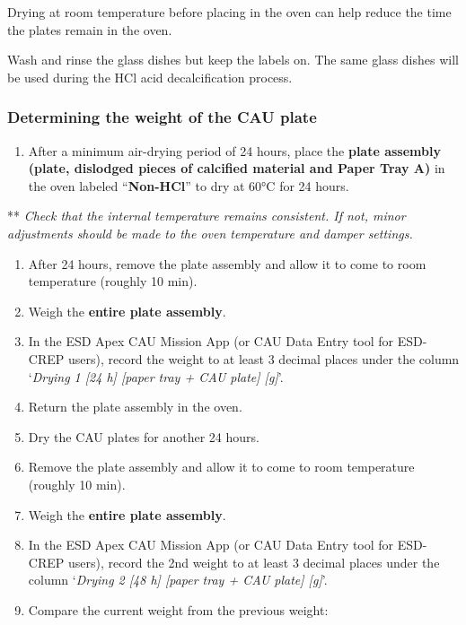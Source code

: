 \documentclass[]{book}
\providecommand{\tightlist}{%
  \setlength{\itemsep}{0pt}\setlength{\parskip}{0pt}}
\begin{document}
Drying at room temperature before placing in the oven can help reduce the time the plates remain in the oven.

Wash and rinse the glass dishes but keep the labels on. The same glass dishes will be used during the HCl acid decalcification process.

\hypertarget{determining-the-weight-of-the-cau-plate}{%
\subsubsection{Determining the weight of the CAU plate}\label{determining-the-weight-of-the-cau-plate}}

\begin{enumerate}
\def\labelenumi{\arabic{enumi}.}
\tightlist
\item
  After a minimum air-drying period of 24 hours, place the \textbf{plate assembly (plate, dislodged pieces of calcified material and Paper Tray A)} in the oven labeled ``\textbf{Non-HCl}'' to dry at 60°C for 24 hours.
\end{enumerate}

** \emph{Check that the internal temperature remains consistent. If not, minor adjustments should be made to the oven temperature and damper settings.}

\begin{enumerate}
\def\labelenumi{\arabic{enumi}.}
\setcounter{enumi}{1}
\item
  After 24 hours, remove the plate assembly and allow it to come to room temperature (roughly 10 min).
\item
  Weigh the \textbf{entire plate assembly}.
\item
  In the ESD Apex CAU Mission App (or CAU Data Entry tool for ESD-CREP users), record the weight to at least 3 decimal places under the column `\emph{Drying 1 {[}24 h{]} {[}paper tray + CAU plate{]} {[}g{]}}'.
\item
  Return the plate assembly in the oven.
\item
  Dry the CAU plates for another 24 hours.
\item
  Remove the plate assembly and allow it to come to room temperature (roughly 10 min).
\item
  Weigh the \textbf{entire plate assembly}.
\item
  In the ESD Apex CAU Mission App (or CAU Data Entry tool for ESD-CREP users), record the 2nd weight to at least 3 decimal places under the column `\emph{Drying 2 {[}48 h{]} {[}paper tray + CAU plate{]} {[}g{]}}'.
\item
  Compare the current weight from the previous weight:
\end{enumerate}
\end{document}
